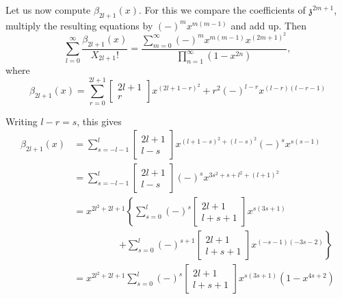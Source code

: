 Let us now compute $\beta_{2l+1}(x)$. For this we compare the
coefficients of $\mathfrak{z}^{2m+1}$, multiply the resulting
equations by $(-)^m x^{m(m-1)}$ and add up. Then
\begin{equation*}
  \sum^\infty_{l=0} \frac{\beta_{2l+1}(x)}{X_{2l+1}!} =
  \frac{\sum\limits^\infty_{m=0} (-)^m x^{m(m-1)}
    x^{(2m+1)^2}}{\prod\limits^\infty_{n=1} (1- x^{2n})},
  \tag{6}\label{part1:lec7:eq6} 
\end{equation*}
where\pageoriginale
\begin{equation*}
  \beta_{2l+1}(x) = \sum^{2l+1}_{r=0} \begin{bmatrix}
    2l+1\\r\end{bmatrix}x^{(2l+1-r)^2} + r^2 (-)^{l-r} x^{(l-r) (l-r-1)}
\end{equation*}

Writing $l-r=s$, this gives
\begin{align*}
  \beta_{2l+1}(x) & = \sum^{l}_{s=-l-1} \begin{bmatrix}
    2l+1\\l-s\end{bmatrix}x^{(l+1-s)^2 + (l-s)^2} (-)^{s} x^{s(s-1)}\\
    & = \sum^l_{s=-l-1} \begin{bmatrix} 2l+1\\l-s \end{bmatrix} (-)^s
    x^{3s^2 +s + l^2+(l+1)^2}\\
    & = x^{2l^2 +2l +1} \left\{\sum^l_{s=0} (-)^s \begin{bmatrix}
      2l+1\\l+s+1\end{bmatrix} x^{s(3s+1)}\right.\\
      & \hspace{2cm}\left.+ \sum^l_{s=0}
      (-)^{s+1} \begin{bmatrix} 2l+1\\l+s+1\end{bmatrix}
        x^{(-s-1)(-3s-2)} \right\}\\
    & = x^{2l^2 + 2l +1} \sum^l_{s=0} (-)^s 
        \begin{bmatrix}2l+1\\l+s+1\end{bmatrix} x^{s(3s+1)}
          (1-x^{4s+2}) \tag{7}\label{part1:lec7:eq7}   
\end{align*}

